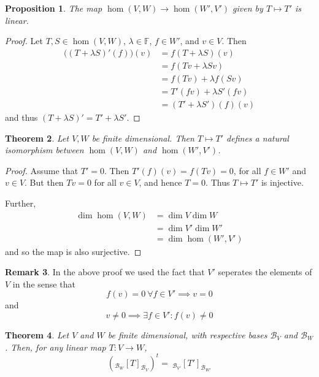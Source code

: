 \documentclass[10pt,fleqn]{article}
\newcommand{\field}{\mathbb{F}}
\newcommand{\basis}{\mathcal{B}}
\theoremstyle{definition} \newtheorem{defn}{Definition}[section]
\theoremstyle{plain}      \newtheorem{thm}[defn]{Theorem}
\theoremstyle{plain}      \newtheorem{prop}[defn]{Proposition}
\theoremstyle{plain}      \newtheorem{lem}[defn]{Lemma}
\theoremstyle{plain}      \newtheorem{cor}[defn]{Corollary}
\theoremstyle{plain}      \newtheorem{ad}[defn]{Addendum}
\theoremstyle{definition} \newtheorem{ex}[defn]{Example}
\theoremstyle{definition} \newtheorem{rem}[defn]{Remark}
\numberwithin{equation}{subsection}
\begin{document}
\begin{prop}
    The map $\hom(V,W)\to\hom(W',V')$ given by $T\mapsto T'$ is linear.
\end{prop}

\begin{proof}
    Let $T,S\in\hom(V,W)$, $\lambda\in\field$, $f\in W'$, and $v\in V$.
    Then
    \begin{align*}
        \big((T+\lambda S)'(f)\big)(v)
        &=
        f(T+\lambda S)(v)\\
        &=
        f(Tv+\lambda Sv)\\
        &=
        f(Tv)+\lambda f(Sv)\\
        &=
        T'(fv)+\lambda S'(fv)\\
        &=
        (T'+\lambda S')(f)(v)
    \end{align*}
    and thus $(T+\lambda S)'=T'+\lambda S'$.
\end{proof}

\begin{thm}
    Let $V,W$ be finite dimensional.
    Then $T\mapsto T'$ defines a natural isomorphism between $\hom(V,W)$ and $\hom(W',V')$.
\end{thm}

\begin{proof}
    Assume that $T'=0$.
    Then $T'(f)(v)=f(Tv)=0$, for all $f\in W'$ and $v\in V$.
    But then $Tv=0$ for all $v\in V$, and hence $T=0$.
    Thus $T\mapsto T'$ is injective.

    Further,
    \begin{align*}
        \dim\hom(V,W)
        &=
        \dim V \dim W\\
        &=
        \dim V' \dim W'\\
        &=
        \dim\hom(W',V')
    \end{align*}
    and so the map is also surjective.
\end{proof}

\begin{rem}
    In the above proof we used the fact that $V'$ seperates the elements of $V$ in the sense that
    \[
        f(v)=0~\forall f\in V'\implies
        v=0
    \]
    and
    \[
        v\neq0\implies
        \exists f\in V'\colon f(v)\neq0
    \]
\end{rem}

\begin{thm}
    Let $V$ and $W$ be finite dimensional, with respective bases $\basis_V$ and $\basis_W$.
    Then, for any linear map $T:V\to W$,
    \[
        (_{\basis_W}[T]_{\basis_V})^t=~
        _{\basis_{V'}}[T']_{\basis_{W'}}
    \]
\end{thm}
\end{document}
